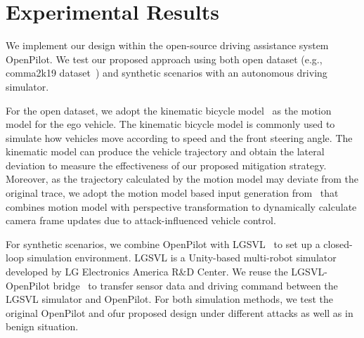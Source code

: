 \section{Experimental Results}
\label{sec:experiments}

We implement our design within the open-source driving assistance system OpenPilot. We test our proposed approach using both open dataset (e.g., comma2k19 dataset~\cite{schafer2018commute}) and
synthetic scenarios with an autonomous driving simulator.

For the open dataset, we adopt the kinematic bicycle model~\cite{kong2015kinematic} as the motion model for the ego vehicle. The kinematic bicycle model is commonly used to simulate how vehicles move according to speed and the front steering angle. The kinematic model can produce the vehicle trajectory and obtain the lateral deviation to measure the effectiveness of our proposed mitigation strategy. Moreover, as the trajectory calculated by the motion model may deviate from the original trace, we adopt the motion model based input generation from~\cite{sato2020hold} that combines motion model with perspective transformation to dynamically calculate camera frame updates due to attack-influenced vehicle control. %



For synthetic scenarios, we combine OpenPilot with LGSVL~\cite{rong2020lgsvl} to set up a closed-loop simulation environment. LGSVL is a Unity-based multi-robot simulator developed by LG Electronics America R\&D Center.  We reuse the LGSVL-OpenPilot bridge~\cite{sato2020hold} to transfer sensor data and driving command between the LGSVL simulator and OpenPilot. For both simulation methods, we test the original OpenPilot and ofur proposed design under different attacks as well as in benign situation.



